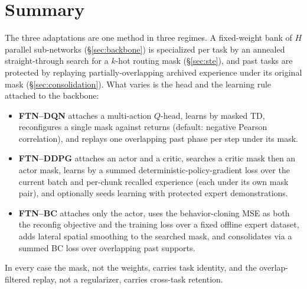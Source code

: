 \documentclass[11pt]{article}
\newcommand{\Ho}{H}                        %
\newcommand{\kk}{k}                        %
\begin{document}
\section{Summary}

The three adaptations are one method in three regimes. A fixed-weight bank of
$\Ho$ parallel sub-networks (\S\ref{sec:backbone}) is specialized per task by an
annealed straight-through search for a $\kk$-hot routing mask (\S\ref{sec:ste}),
and past tasks are protected by replaying partially-overlapping archived
experience under its original mask (\S\ref{sec:consolidation}). What varies is the
head and the learning rule attached to the backbone:
\begin{itemize}[leftmargin=1.5em,itemsep=1pt]
  \item \textbf{FTN--DQN} attaches a multi-action $Q$-head, learns by masked TD,
  reconfigures a single mask against returns (default: negative Pearson
  correlation), and replays one overlapping past phase per step under its mask.
  \item \textbf{FTN--DDPG} attaches an actor and a critic, searches a critic mask
  then an actor mask, learns by a summed deterministic-policy-gradient loss over
  the current batch and per-chunk recalled experience (each under its own mask
  pair), and optionally seeds learning with protected expert demonstrations.
  \item \textbf{FTN--BC} attaches only the actor, uses the behavior-cloning MSE as
  both the reconfig objective and the training loss over a fixed offline expert
  dataset, adds lateral spatial smoothing to the searched mask, and consolidates
  via a summed BC loss over overlapping past supports.
\end{itemize}
In every case the mask, not the weights, carries task identity, and the
overlap-filtered replay, not a regularizer, carries cross-task retention.
\end{document}
